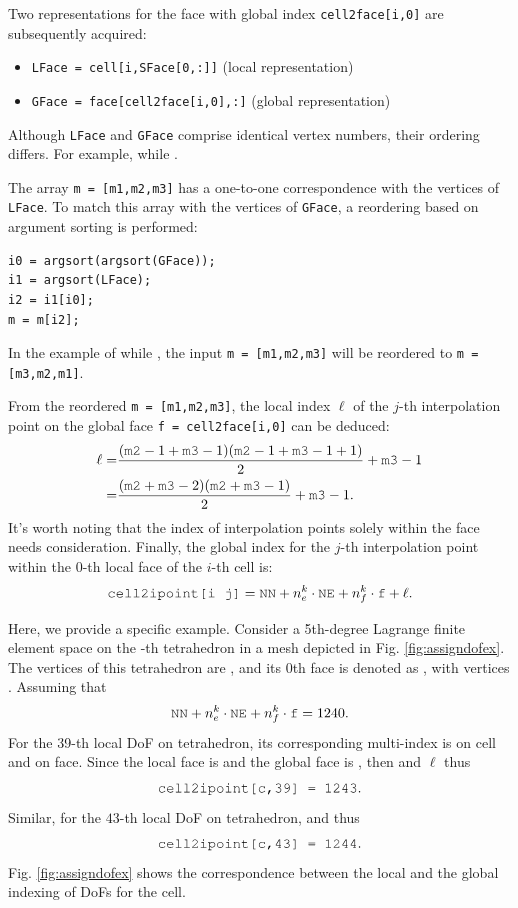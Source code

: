 \documentclass[mathpazo]{cicp}
\begin{document}
Two representations for the face with global index \lstinline{cell2face[i,0]} are subsequently acquired:
\begin{itemize}
  \item \lstinline{LFace = cell[i,SFace[0,:]]} (local representation)
  \item \lstinline{GFace = face[cell2face[i,0],:]} (global representation)
\end{itemize}
Although \lstinline{LFace} and \lstinline{GFace} comprise identical vertex
numbers, their ordering differs. For example,  while . 

The array \lstinline{m = [m1,m2,m3]} has a
one-to-one correspondence with the vertices of \lstinline{LFace}. To match this
array with the vertices of \lstinline{GFace}, a reordering based on argument
sorting is performed:
\begin{lstlisting}
i0 = argsort(argsort(GFace));
i1 = argsort(LFace);
i2 = i1[i0];
m = m[i2];
\end{lstlisting}
In the example of  while , the input \lstinline{m = [m1,m2,m3]} will be reordered to \lstinline{m = [m3,m2,m1]}.

From the reordered \lstinline{m = [m1,m2,m3]}, the local index \(\ell\) of the
$j$-th interpolation point on the global face \lstinline{f = cell2face[i,0]} can
be deduced:
\begin{align*}
   \ell = & \frac{(\mc{m2}-1 + \mc{m3}-1)(\mc{m2}-1 + \mc{m3}-1 + 1)}{2} + \mc{m3}-1 \\
   =& \frac{(\mc{m2} + \mc{m3} -2)(\mc{m2} + \mc{m3} - 1)}{2} + \mc{m3}-1.
\end{align*}
It's worth noting that the index of interpolation points solely within the face
needs consideration. Finally, the global index for the $j$-th
interpolation point within the $0$-th local face of the $i$-th cell is:
\[
    \mc{cell2ipoint[i j]} = \mc{NN} + n_e^k\cdot \mc{NE} + n_f^k\cdot \mc{f} + \ell.
\]

Here, we provide a specific example. Consider a 5th-degree Lagrange finite
element space on the -th tetrahedron in a
mesh depicted in Fig. \ref{fig:assigndofex}. The vertices of this tetrahedron
are \mc{[5,17,0,21]}, and its 0th face is denoted as , with vertices 
\mc{[0,17,21]}. Assuming that 
\[
    \mc{NN} + n_e^k\cdot \mc{NE} + n_f^k\cdot \mc{f} = 1240.
\]
For the 39-th local DoF on tetrahedron, 
its corresponding multi-index is \mc{[0,3,1,1]} on cell and  \mc{[3,1,1]} 
on face. Since the local face is \mc{[17,0,21]} and the global face is
\mc{[0,17,21]}, then  and $\ell$  thus
\[
    \mc{cell2ipoint[c,39] = 1243}.
\]
Similar, for the $43$-th local DoF on tetrahedron,  and
 thus
\[
    \mc{cell2ipoint[c,43] = 1244}.
\]
Fig. \ref{fig:assigndofex} shows the correspondence between the local and the global indexing of DoFs for the cell.
\end{document}
